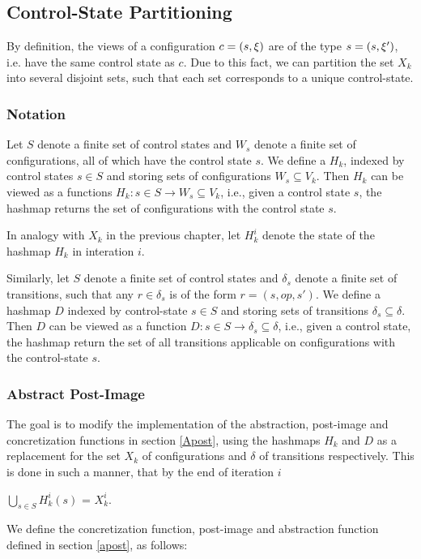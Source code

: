 \subsection{Control-State Partitioning}
By definition, the views of a configuration $c = (s, \xi)$ are of the type $s = (s, \xi')$, i.e. have the same control state as $c$. Due to this fact, we can partition the set $X_k$ into several disjoint sets, such that each set corresponds to a unique control-state.

\subsubsection{Notation}
Let $S$ denote a finite set of control states and $W_s$ denote a finite set of configurations, all of which have the control state $s$. We define a  $H_k$, indexed by control states $s \in S$ and storing sets of configurations $W_s \subseteq V_k$. Then $H_k$ can be viewed as a functions $H_k : s \in S \rightarrow W_s \subseteq V_k$, i.e., given a control state $s$, the hashmap returns the set of configurations with the control state $s$. 

In analogy with $X_k$ in the previous chapter, let $H_k^i$ denote the state of the hashmap $H_k$ in interation $i$.

Similarly, let $S$ denote a finite set of control states and $\delta_s$ denote a finite set of transitions, such that any $r \in \delta_s$ is of the form $r = (s, op, s')$. We define a hashmap $D$ indexed by control-state $s \in S$ and storing sets of transitions $\delta_s \subseteq \delta$. Then $D$ can be viewed as a function $D : s \in S \rightarrow \delta_s \subseteq \delta$, i.e., given a control state, the hashmap return the set of all transitions applicable on configurations with the control-state $s$.

\subsubsection{Abstract Post-Image}
The goal is to modify the implementation of the abstraction, post-image and concretization functions in section \ref{Apost}, using the hashmaps $H_k$ and $D$ as a replacement for the set $X_k$ of configurations and $\delta$ of transitions respectively. This is done in such a manner, that by the end of iteration $i$

$\bigcup\limits_{s \in S} H_k^i(s)$ = $X_k^i$.

We define the concretization function, post-image and abstraction function defined in section \ref{apost}, as follows:


